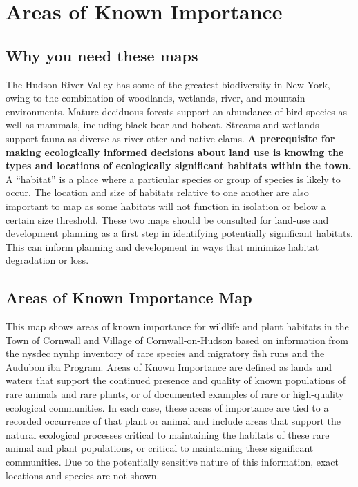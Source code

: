 \section{Areas of Known Importance}\label{subsec:areasofknownimportance}
\subsection*{Why you need these maps} 
The Hudson River Valley has some of the greatest biodiversity in New York, 
owing to the combination of woodlands, wetlands, river, and mountain 
environments.  Mature deciduous forests support an abundance of bird species as 
well as mammals, including black bear and bobcat. Streams and wetlands support 
fauna as diverse as river otter and native clams. \textbf{A 
prerequisite for making ecologically informed decisions about land use is 
knowing the types and locations of ecologically significant habitats within the 
town.} A ``habitat'' is a place where a particular species or group of species 
is likely to occur. The location and size of habitats relative to one another 
are also important to map as some habitats will not function in isolation or 
below a certain size threshold. These two maps should be consulted for land-use 
and development planning as a first step in identifying potentially significant 
habitats. This can inform planning and development in ways that minimize 
habitat degradation or loss.
\par
\subsection*{Areas of Known Importance Map}\label{subsec:aokimportancemap}
This map shows areas of known importance for wildlife and plant habitats in the
Town of Cornwall and Village of Cornwall-on-Hudson based on information from
the \gls{nysdec} \gls{nynhp} inventory of rare species and migratory fish runs
and the Audubon \gls{iba} Program. Areas of Known Importance are defined as
lands and waters that support the continued presence and quality of known
populations of rare animals and rare plants, or of documented examples of rare
or high-quality ecological communities. In each case, these areas of importance
are tied to a recorded occurrence of that plant or animal and include areas
that support the natural ecological processes critical to maintaining the
habitats of these rare animal and plant populations, or critical to maintaining
these significant communities. Due to the potentially sensitive nature of this
information, exact locations and species are not shown. 
